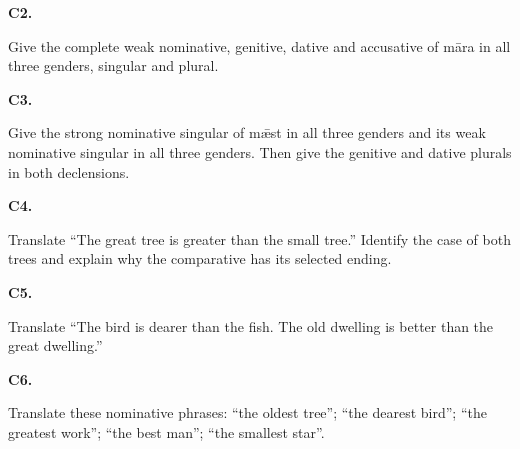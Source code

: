 \par\begin{minipage}{\linewidth}\raggedright
\textbf{C2.}

Give the complete weak nominative, genitive, dative and accusative of māra in all three genders, singular and plural.

\end{minipage}\par\addvspace{4pt}

\par\begin{minipage}{\linewidth}\raggedright
\textbf{C3.}

Give the strong nominative singular of mǣst in all three genders and its weak nominative singular in all three genders. Then give the genitive and dative plurals in both declensions.

\end{minipage}\par\addvspace{4pt}

\par\begin{minipage}{\linewidth}\raggedright
\textbf{C4.}

Translate “The great tree is greater than the small tree.” Identify the case of both trees and explain why the comparative has its selected ending.

\end{minipage}\par\addvspace{4pt}

\par\begin{minipage}{\linewidth}\raggedright
\textbf{C5.}

Translate “The bird is dearer than the fish. The old dwelling is better than the great dwelling.”

\end{minipage}\par\addvspace{4pt}

\par\begin{minipage}{\linewidth}\raggedright
\textbf{C6.}

Translate these nominative phrases: “the oldest tree”; “the dearest bird”; “the greatest work”; “the best man”; “the smallest star”.

\end{minipage}\par\addvspace{4pt}

